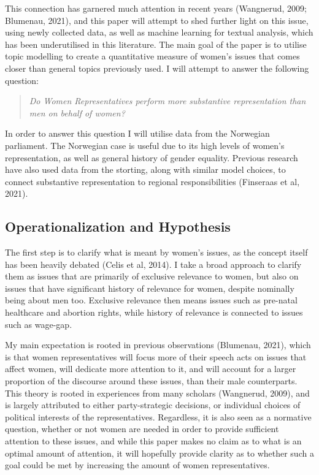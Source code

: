 \documentclass[12pt]{article}
\begin{document}
	This connection has garnered much attention in recent years (Wangnerud, 2009; Blumenau, 2021), and this paper will attempt to shed further light on this issue, using newly collected data, as well as machine learning for textual analysis, which has been underutilised in this literature. The main goal of the paper is to utilise topic modelling to create a quantitative measure of women's issues that comes closer than general topics previously used. I will attempt to answer the following question:
	
	\begin{quotation}
		\textit{Do Women Representatives perform more substantive representation than men on behalf of women?}
	\end{quotation}
	
	In order to answer this question I will utilise data from the Norwegian parliament. The Norwegian case is useful due to its high levels of women's representation, as well as general history of gender equality. Previous research have also used data from the storting, along with similar model choices, to connect substantive representation to regional responsibilities (Finseraas et al, 2021).
	
	\subsection{Operationalization and Hypothesis}
	
	The first step is to clarify what is meant by women's issues, as the concept itself has been heavily debated (Celis et al, 2014). I take a broad approach to clarify them as issues that are primarily of exclusive relevance to women, but also on issues that have significant history of relevance for women, despite nominally being about men too. Exclusive relevance then means issues such as pre-natal healthcare and abortion rights, while history of relevance is connected to issues such as wage-gap. 
	
	My main expectation is rooted in previous observations (Blumenau, 2021), which is that women representatives will focus more of their speech acts on issues that affect women, will dedicate more attention to it, and will account for a larger proportion of the discourse around these issues, than their male counterparts. This theory is rooted in experiences from many scholars (Wangnerud, 2009), and is largely attributed to either party-strategic decisions, or individual choices of political interests of the representatives. Regardless, it is also seen as a normative question, whether or not women are needed in order to provide sufficient attention to these issues, and while this paper makes no claim as to what is an optimal amount of attention, it will hopefully provide clarity as to whether such a goal could be met by increasing the amount of women representatives. 
	
\end{document}

